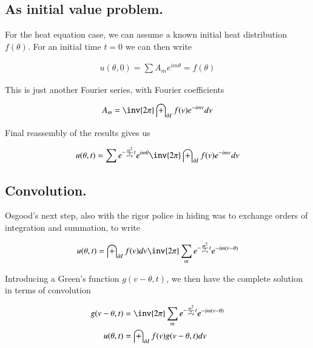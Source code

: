 \documentclass{article}
\begin{document}
\subsection{ As initial value problem. }

For the heat equation case, we can assume a known initial heat distribution 
$f(\theta)$.
For an initial time $t=0$ we can then write

\begin{align*}
u(\theta, 0) = \sum A_m e^{i m \theta} = f(\theta)
\end{align*}

This is just another Fourier series, with Fourier coefficients

\begin{align*}
A_m = \inv{2\pi} \int_{\partial I} f(v) e^{-i m v} dv
\end{align*}

Final reassembly of the results gives us

\begin{align}
u(\theta, t) = \sum e^{- \frac{m^2}{ r^2 \kappa } t } e^{i m \theta} \inv{2\pi} \int_{\partial I} f(v) e^{-i m v} dv
\end{align}

\subsection{ Convolution. }

Osgood's next step, also with the rigor police in hiding was to exchange orders of integration and summation, to write

\begin{align*}
u(\theta, t) 
&= 
\int_{\partial I} f(v) dv \inv{2 \pi} \sum_m e^{- \frac{m^2}{ r^2 \kappa } t } e^{-i m (v -\theta)} \\
\end{align*}

Introducing a Green's function $g(v - \theta, t)$, we then have the complete solution in terms of convolution

\begin{align*}
g( v - \theta, t ) &= \inv{2 \pi} \sum_m e^{- \frac{m^2}{ r^2 \kappa } t } e^{-i m (v -\theta)} \\
u(\theta, t) &= \int_{\partial I} f(v) g(v - \theta, t) dv 
\end{align*}

%
%
\end{document}
